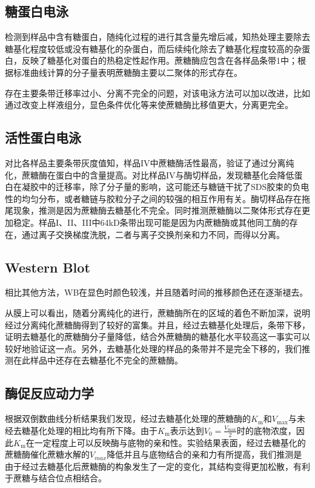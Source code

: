\subsection{糖蛋白电泳}
\par 检测到样品中含有糖蛋白，随纯化过程的进行其含量先增后减，知热处理主要除去糖基化程度较低或没有糖基化的杂蛋白，而后续纯化除去了糖基化程度较高的杂蛋白，反映了糖基化对蛋白的热稳定性起作用。蔗糖酶应包含在各样品条带1中；根据标准曲线计算的分子量表明蔗糖酶主要以二聚体的形式存在。
\par 存在主要条带迁移率过小、分离不完全的问题，对该电泳方法可以加以改进，比如通过改变上样液组分，显色条件优化等来使蔗糖酶比移值更大，分离更完全。
\subsection{活性蛋白电泳}
\par 对比各样品主要条带灰度值知，样品IV中蔗糖酶活性最高，验证了通过分离纯化，蔗糖酶在蛋白中的含量提高。对比样品IV与酶切样品，发现糖基化会降低蛋白在凝胶中的迁移率，除了分子量的影响，这可能还与糖链干扰了SDS胶束的负电性的均匀分布，或者糖链与胶粒分子之间的较强的相互作用有关。酶切样品存在拖尾现象，推测是因为蔗糖酶去糖基化不完全。同时推测蔗糖酶以二聚体形式存在更加稳定。样品I、II、III中64kD条带出现可能是因为内蔗糖酶或其他同工酶的存在，通过离子交换梯度洗脱，二者与离子交换剂亲和力不同，而得以分离。

\subsection{Western Blot}
相比其他方法，WB在显色时颜色较浅，并且随着时间的推移颜色还在逐渐褪去。

从膜上可以看出，随着分离纯化的进行，蔗糖酶所在的区域的着色不断加深，说明经过分离纯化蔗糖酶得到了较好的富集。并且，经过去糖基化处理后，条带下移，证明去糖基化的蔗糖酶分子量降低，结合外蔗糖酶的糖基化水平较高这一事实可以较好地验证这一点。另外，去糖基化处理的样品的条带并不是完全下移的，我们推测在此样品中还存在去糖基化不完全的蔗糖酶。

\subsection{酶促反应动力学}
根据双倒数曲线分析结果我们发现，经过去糖基化处理的蔗糖酶的$K_\mathrm{m}$和$V_\mathrm{max}$与未经去糖基化处理的相比均有所下降。由于$K_\mathrm{m}$表示达到$V_0=\frac{V_\mathrm{max}}{2}$时的底物浓度，因此$K_\mathrm{m}$在一定程度上可以反映酶与底物的亲和性。实验结果表面，经过去糖基化的蔗糖酶催化蔗糖水解的$V_{max}$降低并且与底物结合的亲和力有所提高，我们推测是由于经过去糖基化后蔗糖酶的构象发生了一定的变化，其结构变得更加松散，有利于蔗糖与结合位点相结合。

